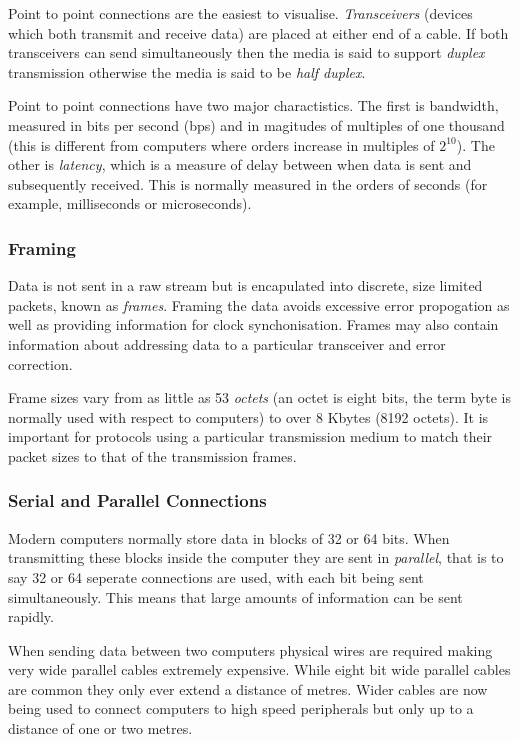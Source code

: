 Point to point connections are the easiest to visualise.  {\em
Transceivers} (devices which both transmit and receive data) are
placed at either end of a cable.  If both transceivers can send
simultaneously then the media is said to support {\em duplex}
transmission otherwise the media is said to be {\em half duplex}.

Point to point connections have two major charactistics.  The first is
bandwidth, measured in bits per second (bps) and in magitudes of
multiples of one thousand (this is different from computers where
orders increase in multiples of $2^{10}$).  The other is {\em
latency}, which is a measure of delay between when data is sent and
subsequently received.  This is normally measured in the orders of
seconds (for example, milliseconds or microseconds).

\subsubsection{Framing}

Data is not sent in a raw stream but is encapulated into discrete,
size limited packets, known as {\em frames}.  Framing the data avoids
excessive error propogation as well as providing information for
clock synchonisation.  Frames may also contain information about
addressing data to a particular transceiver and error correction.

Frame sizes vary from as little as 53 {\em octets} (an octet is eight
bits,  the term byte is normally used with respect to computers) to
over 8 Kbytes (8192 octets).  It is important for protocols using a
particular transmission medium to match their packet sizes to that of
the transmission frames.

\subsubsection{Serial and Parallel Connections}

Modern computers normally store data in blocks of 32 or 64 bits.  When
transmitting these blocks inside the computer they are sent in {\em
parallel}, that is to say 32 or 64 seperate connections are used, with
each bit being sent simultaneously.  This means that large amounts of
information can be sent rapidly.

When sending data between two computers physical wires are required
making very wide parallel cables extremely expensive.  While eight bit
wide parallel cables are common they only ever extend a distance of
metres.  Wider cables are now being used to connect computers to high
speed peripherals but only up to a distance of one or two metres.

